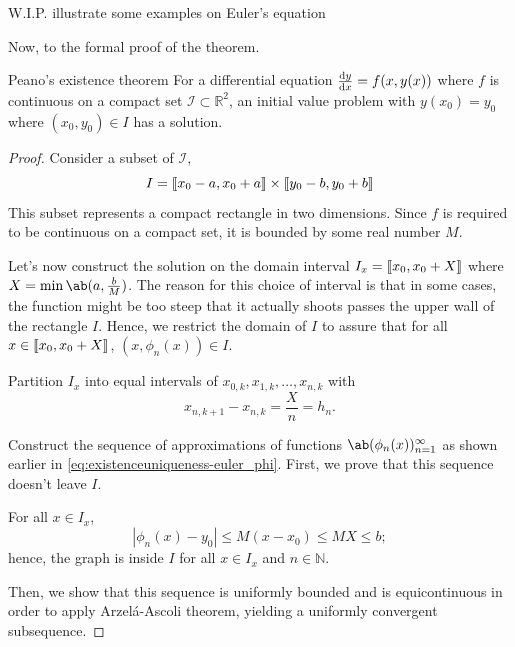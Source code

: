 {\color{red} W.I.P. illustrate some examples on Euler's equation}

Now, to the formal proof of the theorem.

\begin{theorem}{Peano's existence theorem}{}
  For a differential equation \(\odv{y}{x} = f(x, y(x))\) where \(f\) is continuous
  on a compact set \(\mathcal{I} \subset \mathbb{R}^2\), an initial value problem with
  \(y(x_0) = y_0\) where \((x_0, y_0) \in I\) has a solution.
\end{theorem}

\begin{proof}
  Consider a subset of \(\mathcal{I}\),
  \begin{equation}
    I = \cintv{x_0 - a, x_0 + a} \times \cintv{y_0 - b, y_0 + b}
  \end{equation}
  This subset represents a compact rectangle in two dimensions. Since \(f\) is required
  to be continuous on a compact set, it is bounded by some real number \(M\).

  Let's now construct the solution on the domain interval \(I_x = \cintv{x_0, x_0 + X}\)
  where \(X = \min\ab(a, \frac{b}{M})\). The reason for this choice of interval is that
  in some cases, the function might be too steep that it actually shoots passes the
  upper wall of the rectangle \(I\). Hence, we restrict the domain of \(I\) to assure
  that for all \(x \in \cintv{x_0, x_0 + X}\), \((x, \phi_n(x)) \in I\).

  Partition \(I_x\) into equal intervals of \(x_{0, k}, x_{1, k}, \dots, x_{n, k}\) with
  \begin{equation}
    x_{n, k+1} - x_{n, k} = \frac{X}{n} = h_n.
  \end{equation}

  Construct the sequence of approximations of functions \(\sequence{\phi_n(x)}{n = 1}{\infty}\)
  as shown earlier in \cref{eq:existenceuniqueness-euler_phi}. First, we prove that
  this sequence doesn't leave \(I\).

  For all \(x \in I_x\),
  \begin{equation}
    |\phi_n(x) - y_0| \leq M(x - x_0) \leq MX \leq b;
  \end{equation}
  hence, the graph is inside \(I\) for all \(x \in I_x\) and \(n \in \mathbb{N}\).

  Then, we show that this sequence is uniformly bounded and is equicontinuous in order
  to apply Arzel\'a-Ascoli theorem, yielding a uniformly convergent subsequence.


\end{proof}

